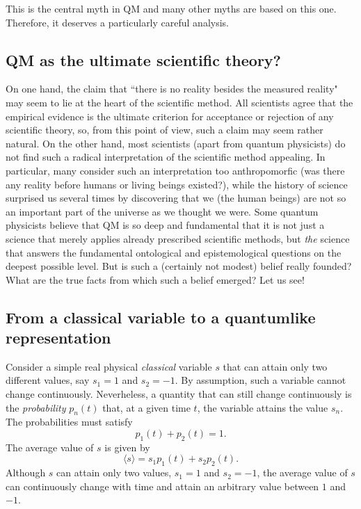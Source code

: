 \documentclass[12pt]{article}
\begin{document}
This is the central myth in QM and many other myths are based 
on this one. Therefore, it deserves a particularly careful 
analysis.

\subsection{QM as the ultimate scientific theory?}

On one hand, the claim that
``there is no reality besides the measured reality"
may seem to lie at the heart of the scientific method. 
All scientists agree that the empirical evidence is the 
ultimate criterion for acceptance or rejection of any 
scientific theory, so, from this point of view, such a claim
may seem rather natural. 
On the other hand, most scientists (apart from quantum physicists) 
do not find such a radical interpretation of the scientific method
appealing. In particular, many consider such an interpretation too 
anthropomorfic (was there any reality before humans or living beings
existed?), while the history of science surprised us several times
by discovering that we (the human beings) are not so an important 
part of the universe as we thought we were. 
Some quantum physicists believe that QM is so 
deep and fundamental that it is not just a science that merely applies 
already prescribed scientific methods, but {\em the} science that 
answers the fundamental ontological and epistemological questions 
on the deepest possible level.
But is such a (certainly not modest) belief really founded? 
What are the true facts from which such a belief emerged? 
Let us see!  

\subsection{From a classical variable to a quantumlike representation}

Consider a simple real physical {\em classical}
variable $s$ that can attain only 
two different values, say $s_1=1$ and $s_2=-1$.
By assumption, such a variable cannot change continuously.
Neverheless, a quantity that can still change continuously
is the {\em probability} $p_n(t)$ that, at a 
given time $t$, the variable attains the value $s_n$.
The probabilities must satisfy
\begin{equation}\label{prob}
p_1(t) + p_2(t)=1 .
\end{equation}
The average value of $s$ is given by
\begin{equation}\label{av}
\langle s \rangle  = s_1p_1(t)+s_2p_2(t) .
\end{equation}
Although $s$ can attain only two values, $s_1=1$ and $s_2=-1$, 
the average value of $s$ can continuously change with time and attain 
an arbitrary value between $1$ and $-1$.  
\end{document}
